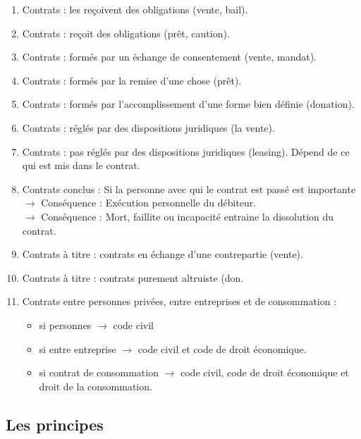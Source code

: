 \begin{enumerate}
	\item Contrats  : les  reçoivent des obligations (vente, bail).
	\item Contrats  :  reçoit des obligations (prêt, caution).
	\item Contrats  : formés par un échange de consentement (vente, mandat).
	\item Contrats  : formés par la remise d'une chose (prêt).
	\item Contrats  : formés par l'accomplissement d'une forme bien définie (donation).
	\item Contrats  : réglés par des dispositions juridiques (la vente).
	\item Contrats  : pas réglés par des dispositions juridiques (leasing). Dépend de ce qui est mis dans le contrat.
	\item Contrats conclus  : Si la personne avec qui le contrat est passé est importante\\
	$\rightarrow$ Conséquence : Exécution personnelle du débiteur.\\
    $\rightarrow$ Conséquence : Mort, faillite ou incapacité entraine la dissolution du contrat.
    \item Contrats à titre  : contrats en échange d'une contrepartie (vente).
    \item Contrats à titre  : contrats purement altruiste (don.
    \bigskip\medskip
    \item Contrats entre personnes privées, entre entreprises et de consommation :
    \begin{itemize}
        	\item si personnes $\rightarrow$ code civil
        	\item si entre entreprise $\rightarrow$ code civil et code de droit économique.
        	\item si contrat de consommation $\rightarrow$ code civil, code de droit économique et droit de la consommation.
    \end{itemize}
\end{enumerate}

\subsection{Les principes}

